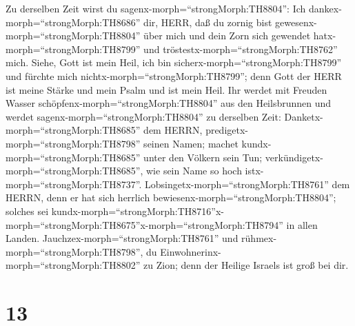  Zu derselben Zeit wirst du
sagenx-morph=``strongMorph:TH8804'': Ich
dankex-morph=``strongMorph:TH8686'' dir, HERR, daß du zornig bist
gewesenx-morph=``strongMorph:TH8804'' über mich und dein Zorn sich
gewendet hatx-morph=``strongMorph:TH8799'' und
tröstestx-morph=``strongMorph:TH8762'' mich.  Siehe, Gott
ist mein Heil, ich bin sicherx-morph=``strongMorph:TH8799'' und fürchte
mich nichtx-morph=``strongMorph:TH8799''; denn Gott der HERR ist meine
Stärke und mein Psalm und ist mein Heil.  Ihr werdet mit
Freuden Wasser schöpfenx-morph=``strongMorph:TH8804'' aus den
Heilsbrunnen  und werdet sagenx-morph=``strongMorph:TH8804''
zu derselben Zeit: Danketx-morph=``strongMorph:TH8685'' dem HERRN,
predigetx-morph=``strongMorph:TH8798'' seinen Namen; machet
kundx-morph=``strongMorph:TH8685'' unter den Völkern sein Tun;
verkündigetx-morph=``strongMorph:TH8685'', wie sein Name so hoch
istx-morph=``strongMorph:TH8737''. 
Lobsingetx-morph=``strongMorph:TH8761'' dem HERRN, denn er hat sich
herrlich bewiesenx-morph=``strongMorph:TH8804''; solches sei
kundx-morph=``strongMorph:TH8716''\textbar x-morph=``strongMorph:TH8675''x-morph=``strongMorph:TH8794''
in allen Landen.  Jauchzex-morph=``strongMorph:TH8761'' und
rühmex-morph=``strongMorph:TH8798'', du
Einwohnerinx-morph=``strongMorph:TH8802'' zu Zion; denn der Heilige
Israels ist groß bei dir.

\hypertarget{section-12}{%
\section{13}\label{section-12}}

